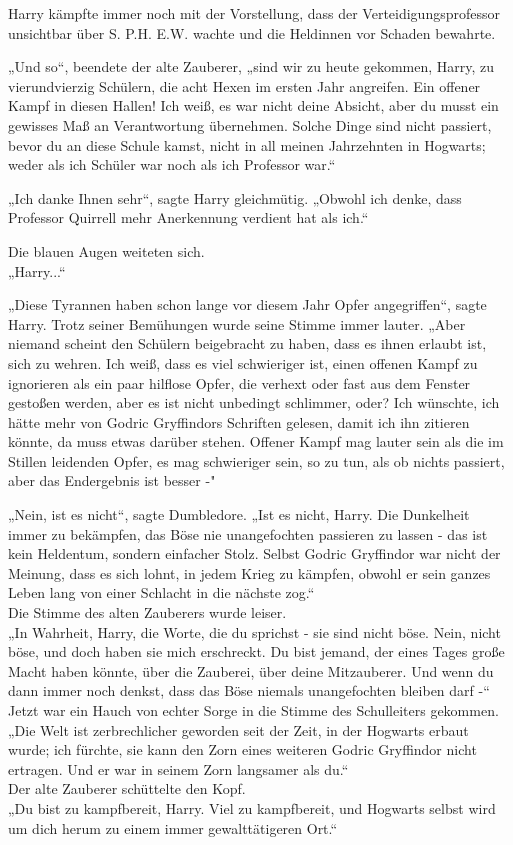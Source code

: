{Harry kämpfte immer noch mit der Vorstellung, dass der Verteidigungsprofessor unsichtbar über S. P.H. E.W. wachte und die Heldinnen vor Schaden bewahrte.

„Und so“, beendete der alte Zauberer, „sind wir zu heute gekommen, Harry, zu vierundvierzig Schülern, die acht Hexen im ersten Jahr angreifen. Ein offener Kampf in diesen Hallen! Ich weiß, es war nicht deine Absicht, aber du musst ein gewisses Maß an Verantwortung übernehmen. Solche Dinge sind nicht passiert, bevor du an diese Schule kamst, nicht in all meinen Jahrzehnten in Hogwarts; weder als ich Schüler war noch als ich Professor war.“

„Ich danke Ihnen sehr“, sagte Harry gleichmütig. „Obwohl ich denke, dass Professor Quirrell mehr Anerkennung verdient hat als ich.“

Die blauen Augen weiteten sich.\\ „Harry...“

„Diese Tyrannen haben schon lange vor diesem Jahr Opfer angegriffen“, sagte Harry. Trotz seiner Bemühungen wurde seine Stimme immer lauter. „Aber niemand scheint den Schülern beigebracht zu haben, dass es ihnen erlaubt ist, sich zu wehren. Ich weiß, dass es viel schwieriger ist, einen offenen Kampf zu ignorieren als ein paar hilflose Opfer, die verhext oder fast aus dem Fenster gestoßen werden, aber es ist nicht unbedingt schlimmer, oder? Ich wünschte, ich hätte mehr von Godric Gryffindors Schriften gelesen, damit ich ihn zitieren könnte, da muss etwas darüber stehen. Offener Kampf mag lauter sein als die im Stillen leidenden Opfer, es mag schwieriger sein, so zu tun, als ob nichts passiert, aber das Endergebnis ist besser -"

„Nein, ist es nicht“, sagte Dumbledore. „Ist es nicht, Harry. Die Dunkelheit immer zu bekämpfen, das Böse nie unangefochten passieren zu lassen - das ist kein Heldentum, sondern einfacher Stolz. Selbst Godric Gryffindor war nicht der Meinung, dass es sich lohnt, in jedem Krieg zu kämpfen, obwohl er sein ganzes Leben lang von einer Schlacht in die nächste zog.“\\ Die Stimme des alten Zauberers wurde leiser.\\ „In Wahrheit, Harry, die Worte, die du sprichst - sie sind nicht böse. Nein, nicht böse, und doch haben sie mich erschreckt. Du bist jemand, der eines Tages große Macht haben könnte, über die Zauberei, über deine Mitzauberer. Und wenn du dann immer noch denkst, dass das Böse niemals unangefochten bleiben darf -“\\ Jetzt war ein Hauch von echter Sorge in die Stimme des Schulleiters gekommen.\\ „Die Welt ist zerbrechlicher geworden seit der Zeit, in der Hogwarts erbaut wurde; ich fürchte, sie kann den Zorn eines weiteren Godric Gryffindor nicht ertragen. Und er war in seinem Zorn langsamer als du.“\\ Der alte Zauberer schüttelte den Kopf.\\ „Du bist zu kampfbereit, Harry. Viel zu kampfbereit, und Hogwarts selbst wird um dich herum zu einem immer gewalttätigeren Ort.“

}
